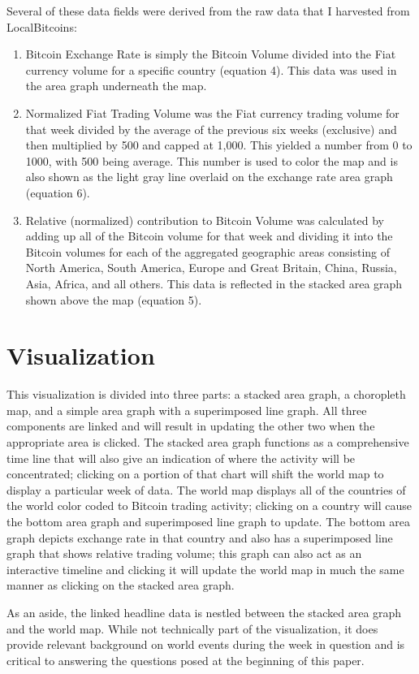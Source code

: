 \documentclass[journal]{vgtc}                %
\begin{document}
Several of these data fields were derived from the raw data that I harvested from LocalBitcoins:
\begin{enumerate}
	\item Bitcoin Exchange Rate is simply the Bitcoin Volume divided into the Fiat currency volume for a specific country (equation 4). This data was used in the area graph underneath the map.
	\item Normalized Fiat Trading Volume was the Fiat currency trading volume for that week divided by the average of the previous six weeks (exclusive) and then multiplied by 500 and capped at 1,000.  This yielded a number from 0 to 1000, with 500 being average.  This number is used to color the map and is also shown as the light gray line overlaid on the exchange rate area graph (equation 6).
	\item Relative (normalized) contribution to Bitcoin Volume was calculated by adding up all of the Bitcoin volume for that week and dividing it into the Bitcoin volumes for each of the aggregated geographic areas consisting of North America, South America, Europe and Great Britain, China, Russia, Asia, Africa, and all others.  This data is reflected in the stacked area graph shown above the map (equation 5).
\end{enumerate}

\section{Visualization}
This visualization is divided into three parts: a stacked area graph, a choropleth map, and a simple area graph with a superimposed line graph.  All three components are linked and will result in updating the other two when the appropriate area is clicked.  The stacked area graph functions as a comprehensive time line that will also give an indication of where the activity will be concentrated; clicking on a portion of that chart will shift the world map to display a particular week of data.  The world map displays all of the countries of the world color coded to Bitcoin trading activity; clicking on a country will cause the bottom area graph and superimposed line graph to update.  The bottom area graph depicts exchange rate in that country and also has a superimposed line graph that shows relative trading volume; this graph can also act as an interactive timeline and clicking it will update the world map in much the same manner as clicking on the stacked area graph.

As an aside, the linked headline data is nestled between the stacked area graph and the world map.  While not technically part of the visualization, it does provide relevant background on world events during the week in question and is critical to answering the questions posed at the beginning of this paper.
\end{document}
